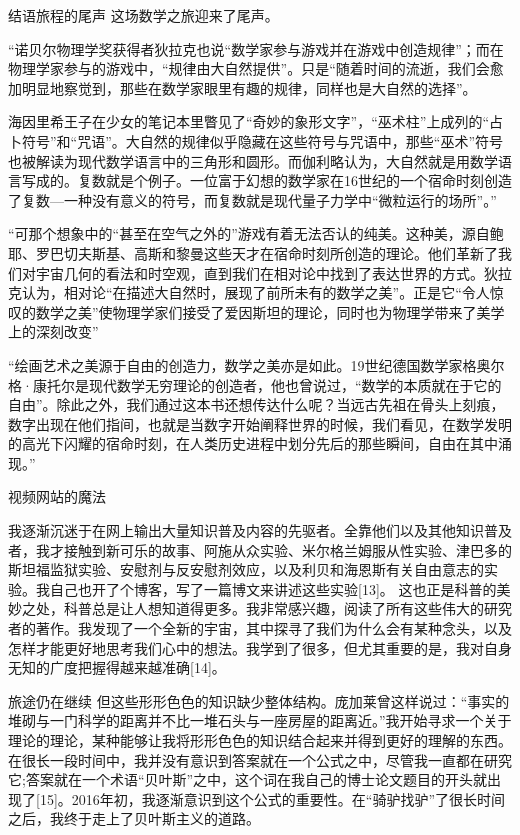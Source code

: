 结语旅程的尾声
这场数学之旅迎来了尾声。

“诺贝尔物理学奖获得者狄拉克也说“数学家参与游戏并在游戏中创造规律”；而在物理学家参与的游戏中，“规律由大自然提供”。只是“随着时间的流逝，我们会愈加明显地察觉到，那些在数学家眼里有趣的规律，同样也是大自然的选择”。

海因里希王子在少女的笔记本里瞥见了“奇妙的象形文字”，“巫术柱”上成列的“占卜符号”和“咒语”。大自然的规律似乎隐藏在这些符号与咒语中，那些“巫术”符号也被解读为现代数学语言中的三角形和圆形。而伽利略认为，大自然就是用数学语言写成的。复数就是个例子。一位富于幻想的数学家在16世纪的一个宿命时刻创造了复数---一种没有意义的符号，而复数就是现代量子力学中“微粒运行的场所”。”

“可那个想象中的“甚至在空气之外的”游戏有着无法否认的纯美。这种美，源自鲍耶、罗巴切夫斯基、高斯和黎曼这些天才在宿命时刻所创造的理论。他们革新了我们对宇宙几何的看法和时空观，直到我们在相对论中找到了表达世界的方式。狄拉克认为，相对论“在描述大自然时，展现了前所未有的数学之美”。正是它“令人惊叹的数学之美”使物理学家们接受了爱因斯坦的理论，同时也为物理学带来了美学上的深刻改变”

“绘画艺术之美源于自由的创造力，数学之美亦是如此。19世纪德国数学家格奥尔格·康托尔是现代数学无穷理论的创造者，他也曾说过，“数学的本质就在于它的自由”。除此之外，我们通过这本书还想传达什么呢？当远古先祖在骨头上刻痕，数字出现在他们指间，也就是当数字开始阐释世界的时候，我们看见，在数学发明的高光下闪耀的宿命时刻，在人类历史进程中划分先后的那些瞬间，自由在其中涌现。”

视频网站的魔法

我逐渐沉迷于在网上输出大量知识普及内容的先驱者。全靠他们以及其他知识普及者，我才接触到新可乐的故事、阿施从众实验、米尔格兰姆服从性实验、津巴多的斯坦福监狱实验、安慰剂与反安慰剂效应，以及利贝和海恩斯有关自由意志的实验。我自己也开了个博客，写了一篇博文来讲述这些实验[13]。
这也正是科普的美妙之处，科普总是让人想知道得更多。我非常感兴趣，阅读了所有这些伟大的研究者的著作。我发现了一个全新的宇宙，其中探寻了我们为什么会有某种念头，以及怎样才能更好地思考我们心中的想法。我学到了很多，但尤其重要的是，我对自身无知的广度把握得越来越准确[14]。

旅途仍在继续
但这些形形色色的知识缺少整体结构。庞加莱曾这样说过：“事实的堆砌与一门科学的距离并不比一堆石头与一座房屋的距离近。”我开始寻求一个关于理论的理论，某种能够让我将形形色色的知识结合起来并得到更好的理解的东西。在很长一段时间中，我并没有意识到答案就在一个公式之中，尽管我一直都在研究它;答案就在一个术语“贝叶斯”之中，这个词在我自己的博士论文题目的开头就出现了[15]。2016年初，我逐渐意识到这个公式的重要性。在“骑驴找驴”了很长时间之后，我终于走上了贝叶斯主义的道路。

